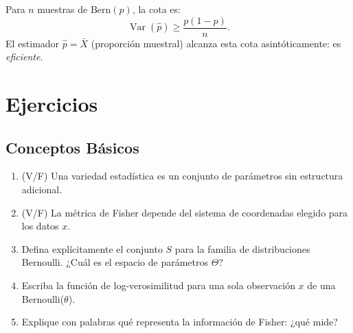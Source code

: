 \begin{example}
	Para $n$ muestras de $\mathrm{Bern}(p)$, la cota es:
	\[
	\operatorname{Var}(\hat p) \ge \frac{p(1-p)}{n}.
	\]
	El estimador $\hat p = \bar X$ (proporción muestral) alcanza esta cota asintóticamente: es \emph{eficiente}.
\end{example}

\section{Ejercicios}

\subsection*{Conceptos Básicos}
\begin{enumerate}
	\item[$\star$] (V/F) Una variedad estadística es un conjunto de parámetros sin estructura adicional.
	\item[$\star$] (V/F) La métrica de Fisher depende del sistema de coordenadas elegido para los datos $x$.
	\item[$\star$] Defina explícitamente el conjunto $S$ para la familia de distribuciones Bernoulli. ¿Cuál es el espacio de parámetros $\Theta$?
	\item[$\star$] Escriba la función de log-verosimilitud para una sola observación $x$ de una Bernoulli($\theta$).
	\item[$\star$] Explique con palabras qué representa la información de Fisher: ¿qué mide?
\end{enumerate}

